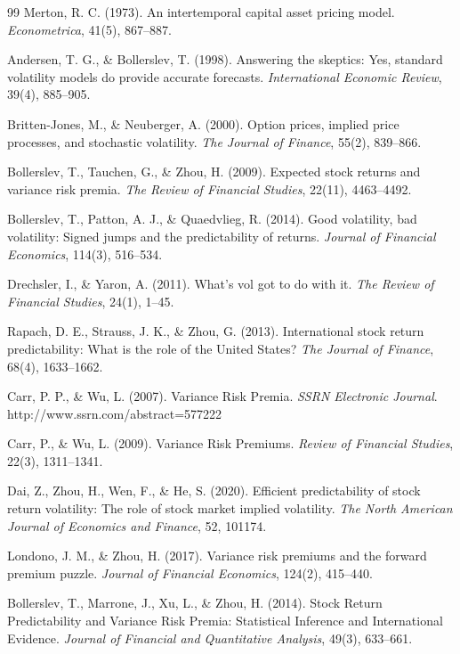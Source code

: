 \documentclass[a4paper, 12pt]{article}    %
\begin{document}
	\begin{thebibliography}{99} %
Merton, R. C. (1973). An intertemporal capital asset pricing model. \textit{Econometrica}, 41(5), 867–887.

Andersen, T. G., \& Bollerslev, T. (1998). Answering the skeptics: Yes, standard volatility models do provide accurate forecasts. \textit{International Economic Review}, 39(4), 885–905.

Britten-Jones, M., \& Neuberger, A. (2000). Option prices, implied price processes, and stochastic volatility. \textit{The Journal of Finance}, 55(2), 839–866.

Bollerslev, T., Tauchen, G., \& Zhou, H. (2009). Expected stock returns and variance risk premia. \textit{The Review of Financial Studies}, 22(11), 4463–4492.

Bollerslev, T., Patton, A. J., \& Quaedvlieg, R. (2014). Good volatility, bad volatility: Signed jumps and the predictability of returns. \textit{Journal of Financial Economics}, 114(3), 516–534.

Drechsler, I., \& Yaron, A. (2011). What’s vol got to do with it. \textit{The Review of Financial Studies}, 24(1), 1–45.

Rapach, D. E., Strauss, J. K., \& Zhou, G. (2013). International stock return predictability: What is the role of the United States? \textit{The Journal of Finance}, 68(4), 1633–1662.

Carr, P. P., \& Wu, L. (2007). Variance Risk Premia. \textit{SSRN Electronic Journal}. http://www.ssrn.com/abstract=577222

Carr, P., \& Wu, L. (2009). Variance Risk Premiums. \textit{Review of Financial Studies}, 22(3), 1311–1341. 

Dai, Z., Zhou, H., Wen, F., \& He, S. (2020). Efficient predictability of stock return volatility: The role of stock market implied volatility. \textit{The North American Journal of Economics and Finance}, 52, 101174. 

Londono, J. M., \& Zhou, H. (2017). Variance risk premiums and the forward premium puzzle. \textit{Journal of Financial Economics}, 124(2), 415–440. 

Bollerslev, T., Marrone, J., Xu, L., \& Zhou, H. (2014). Stock Return Predictability and Variance Risk Premia: Statistical Inference and International Evidence. \textit{Journal of Financial and Quantitative Analysis}, 49(3), 633–661.


\end{thebibliography}
\end{document}
